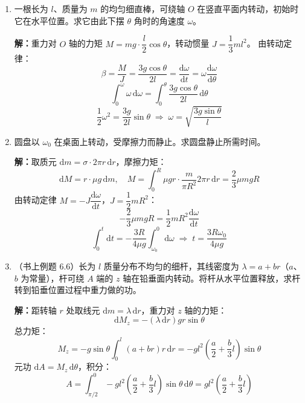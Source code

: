 \documentclass{ctexart}
\begin{document}
\begin{enumerate}
\textbf{解：}动力学方程：
\[
M - Qr_1 = J_1\beta_1,\qquad Qr_2 = J_2\beta_2
\]
齿轮传动关系：$\dfrac{r_1}{r_2} = \dfrac{Z_1}{Z_2}$，$\beta_2 = \dfrac{Z_1}{Z_2}\beta_1$
角加速度：
\[
\beta_1 = \frac{1500}{60}\times 2\pi \times \frac{1}{10} = 5\pi\,\text{s}^{-2}
\]
解得：
\[
M = \left[J_1 + \left(\frac{Z_1}{Z_2}\right)^{2}J_2\right]\beta_1
= \left(98.0 + 78.4\times\frac94\right)\times5\pi \approx 4.31\times10^{3}\,\text{N}\!\cdot\!\text{m}
\]
\[
Q = \frac{J_2}{r_1}\left(\frac{Z_1}{Z_2}\right)^{2}\beta_1
= \frac{78.4}{0.1}\times\frac94\times5\pi \approx 2.77\times10^{4}\,\text{N}
\]

\item 一根长为 $l$、质量为 $m$ 的均匀细直棒，可绕轴 $O$ 在竖直平面内转动，初始时它在水平位置。求它由此下摆 $\theta$ 角时的角速度 $\omega$。

\textbf{解：}重力对 $O$ 轴的力矩 $M = mg\cdot\dfrac{l}{2}\cos\theta$，转动惯量 $J = \dfrac13 ml^{2}$。
由转动定律：
\[
\beta = \frac{M}{J} = \frac{3g\cos\theta}{2l} = \frac{\mathrm{d}\omega}{\mathrm{d}t} = \omega\frac{\mathrm{d}\omega}{\mathrm{d}\theta}
\]
\[
\int_{0}^{\omega} \omega\,\mathrm{d}\omega = \int_{0}^{\theta} \frac{3g\cos\theta}{2l}\,\mathrm{d}\theta
\]
\[
\frac12\omega^{2} = \frac{3g}{2l}\sin\theta \;\Longrightarrow\; \omega = \sqrt{\frac{3g\sin\theta}{l}}
\]

\item 圆盘以 $\omega_0$ 在桌面上转动，受摩擦力而静止。求圆盘静止所需时间。

\textbf{解：}取质元 $\mathrm{d}m = \sigma\cdot2\pi r\,\mathrm{d}r$，摩擦力矩：
\[
\mathrm{d}M = r\cdot\mu g\,\mathrm{d}m,\quad
M = \int_{0}^{R} \mu g r\cdot\frac{m}{\pi R^{2}}2\pi r\,\mathrm{d}r = \frac23\mu mgR
\]
由转动定律 $M = -J\dfrac{\mathrm{d}\omega}{\mathrm{d}t}$，$J = \dfrac12 mR^{2}$：
\[
-\frac23\mu mgR = \frac12 mR^{2}\frac{\mathrm{d}\omega}{\mathrm{d}t}
\]
\[
\int_{0}^{t} \mathrm{d}t = -\frac{3R}{4\mu g}\int_{\omega_0}^{0} \mathrm{d}\omega \;\Longrightarrow\; t = \frac{3R\omega_0}{4\mu g}
\]

\item（书上例题 6.6）长为 $l$ 质量分布不均匀的细杆，其线密度为 $\lambda = a + br$（$a$、$b$ 为常量），杆可绕 $A$ 端的 $z$ 轴在铅垂面内转动。将杆从水平位置释放，求杆转到铅垂位置过程中重力做的功。

\textbf{解：}距转轴 $r$ 处取线元 $\mathrm{d}m = \lambda\,\mathrm{d}r$，重力对 $z$ 轴的力矩：
\[
\mathrm{d}M_z = -(\lambda\,\mathrm{d}r)gr\sin\theta
\]
总力矩：
\[
M_z = -g\sin\theta\int_{0}^{l} (a+br)r\,\mathrm{d}r
= -gl^{2}\left(\frac{a}{2} + \frac{b}{3}l\right)\sin\theta
\]
元功 $\mathrm{d}A = M_z\,\mathrm{d}\theta$，积分：
\[
A = \int_{\pi/2}^{0} -gl^{2}\left(\frac{a}{2} + \frac{b}{3}l\right)\sin\theta\,\mathrm{d}\theta
= gl^{2}\left(\frac{a}{2} + \frac{b}{3}l\right)
\]


\end{enumerate}
\end{document}
